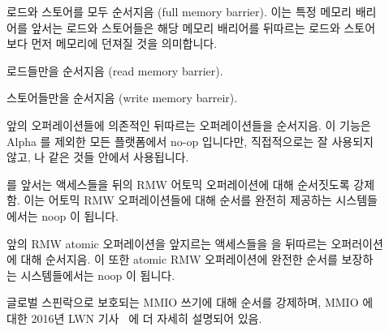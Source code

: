 \begin{description}
\item	[] 로드와 스토어를 모두 순서지음 (full memory barrier).
	이는 특정 메모리 배리어를 앞서는 로드와 스토어들은 해당 메모리 배리어를
	뒤따르는 로드와 스토어보다 먼저 메모리에 던져질 것을 의미합니다.
\item	[] 로드들만을 순서지음 (read memory barrier).
\item	[] 스토어들만을 순서지음 (write memory barreir).
\item	[] 앞의 오퍼레이션들에 의존적인
	뒤따르는 오퍼레이션들을 순서지음.
	이 기능은 Alpha 를 제외한 모든 플랫폼에서 no-op 입니다만, 직접적으로는
	잘 사용되지 않고,  나  같은 것들
	안에서 사용됩니다.
\item	[]  를 앞서는
	액세스들을 뒤의 RMW 어토믹 오퍼레이션에 대해 순서짓도록 강제함.
	이는 어토믹 RMW 오퍼레이션들에 대해 순서를 완전히 제공하는
	시스템들에서는 noop 이 됩니다.
\item	[] 앞의 RMW atomic 오퍼레이션을 앞지르는
	액세스들을  을 뒤따르는 오퍼러이션에 대해
	순서지음.
	이 또한 atomic RMW 오퍼레이션에 완전한 순서를 보장하는 시스템들에서는
	noop 이 됩니다.
\item	[] 글로벌 스핀락으로 보호되는 MMIO 쓰기에 대해 순서를
	강제하며, MMIO 에 대한 2016년 LWN
	기사~\cite{PaulEMcKenney2016LinuxKernelMMIO} 에 더 자세히 설명되어
	있음.

\end{description}
